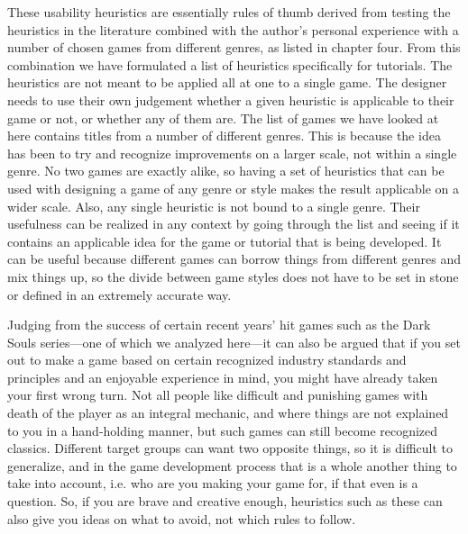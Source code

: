 These usability heuristics are essentially rules of thumb derived from testing the heuristics in the literature combined with the author's personal experience with a number of chosen games from different genres, as listed in chapter four. From this combination we have formulated a list of heuristics specifically for tutorials. The heuristics are not meant to be applied all at one to a single game. The designer needs to use their own judgement whether a given heuristic is applicable to their game or not, or whether any of them are. The list of games we have looked at here contains titles from a number of different genres. This is because the idea has been to try and recognize improvements on a larger scale, not within a single genre. No two games are exactly alike, so having a set of heuristics that can be used with designing a game of any genre or style makes the result applicable on a wider scale. Also, any single heuristic is not bound to a single genre. Their usefulness can be realized in any context by going through the list and seeing if it contains an applicable idea for the game or tutorial that is being developed. It can be useful because different games can borrow things from different genres and mix things up, so the divide between game styles does not have to be set in stone or defined in an extremely accurate way. 

Judging from the success of certain recent years' hit games such as the Dark Souls series---one of which we analyzed here---it can also be argued that if you set out to make a game based on certain recognized industry standards and principles and an enjoyable experience in mind, you might have already taken your first wrong turn. Not all people like difficult and punishing games with death of the player as an integral mechanic, and where things are not explained to you in a hand-holding manner, but such games can still become recognized classics. Different target groups can want two opposite things, so it is difficult to generalize, and in the game development process that is a whole another thing to take into account, i.e. who are you making your game for, if that even is a question. So, if you are brave and creative enough, heuristics such as these can also give you ideas on what to avoid, not which rules to follow.
